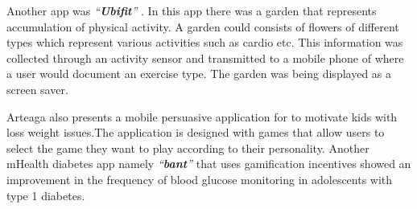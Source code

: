 \documentclass{sig-alternate}
\begin{document}
Another app was \emph{``\textbf{Ubifit}''} \cite{klasnja2009:using}. In this app there was a garden that represents accumulation of physical activity. A garden could consists of flowers of different types which represent various activities such as cardio etc. This information was collected through an activity sensor and transmitted to a mobile phone of where a user would document an exercise type. The garden was being displayed as a screen saver.

Arteaga \cite{arteaga2010:persuasive} also presents a mobile persuasive application for to motivate kids with loss weight issues.The application is designed with games that allow users to select the game they want to play according to their personality. Another mHealth diabetes app namely \emph{``\textbf{bant}''} that uses gamification incentives showed an improvement in the frequency of blood glucose monitoring in adolescents with type 1 diabetes.
\end{document}
